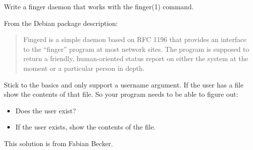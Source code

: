 \begin{Exercise}[title={*Finger daemon},difficulty=8]
\label{ex:finger}
\Question
Write a finger daemon that works with the finger(1) command. 

From the Debian package description:
\begin{quote}
Fingerd is a simple daemon based on RFC 1196 \cite{RFC1196} that provides an interface to the
``finger'' program at most network sites.  The program is supposed to return a
friendly, human-oriented status report on either the system at the moment or a
particular person in depth.
\end{quote}

Stick to the basics and only support a username argument. If the user has a  file
show the contents of that file. So your program needs to be able to figure out:
\begin{itemize}
\item Does the user exist?
\item If the user exists, show the contents of the  file.
\end{itemize}
\end{Exercise}

\begin{Answer}
\begin{lbar}
This solution is from Fabian Becker.
\end{lbar}
\Question

\end{Answer}

